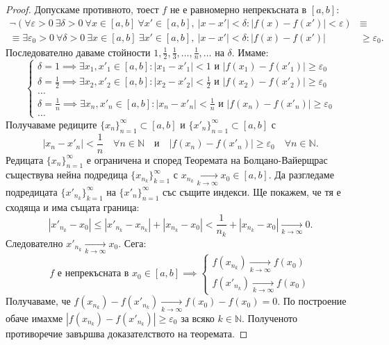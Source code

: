 \begin{proof}
Допускаме противното, тоест $f$ не е равномерно непрекъсната в $[a, b]$:
\begin{align*}
\neg (\forall \varepsilon > 0\ \exists \delta > 0\ \forall x \in [a, b]\ \forall x' \in [a, b],\ |x - x'| < \delta : |f(x) - f(x')| < \varepsilon) &\equiv \\
\equiv \exists \varepsilon_0 > 0\ \forall \delta > 0\ \exists x \in [a, b]\ \exists x' \in [a, b],\ |x - x'| < \delta : |f(x) - f(x')| &\ge \varepsilon_0.
\end{align*}
Последователно даваме стойности $1, \frac{1}{2}, \frac{1}{3}, \dots, \frac{1}{n}, \dots$ на $\delta$. Имаме:
\[
\begin{cases}
\delta = 1 \implies \exists x_1, x'_1 \in [a, b] : |x_1 - x'_1| < 1 \text{ и } |f(x_1) - f(x'_1)| \ge \varepsilon_0 \\
\delta = \frac{1}{2} \implies \exists x_2, x'_2 \in [a, b] : |x_2 - x'_2| < \frac{1}{2} \text{ и } |f(x_2) - f(x'_2)| \ge \varepsilon_0 \\
\dots \\
\delta = \frac{1}{n} \implies \exists x_n, x'_n \in [a, b] : |x_n - x'_n| < \frac{1}{n} \text{ и } |f(x_n) - f(x'_n)| \ge \varepsilon_0 \\
\dots
\end{cases}
\]
Получаваме редиците $\{x_n\}_{n=1}^\infty \subset [a, b]$ и $\{x'_n\}_{n=1}^\infty \subset [a, b]$ с
\[
|x_n - x'_n| < \frac{1}{n}\quad \forall n \in \mathbb{N} \quad \text{и} \quad |f(x_n) - f(x'_n)| \ge \varepsilon_0\quad \forall n \in \mathbb{N}.
\]
Редицата $\{x_n\}_{n=1}^\infty$ е ограничена и според Теоремата на Болцано-Вайерщрас съществува нейна подредица $\{x_{n_k}\}_{k=1}^\infty$ с $x_{n_k} \xrightarrow[k \to \infty]{} x_0 \in [a, b]$. Да разгледаме подредицата $\{x'_{n_k}\}_{k=1}^\infty$ на $\{x'_n\}_{n=1}^\infty$ със същите индекси. Ще покажем, че тя е сходяща и има същата граница:
\[
|x'_{n_k} - x_0| \le |x'_{n_k} - x_{n_k}| + |x_{n_k} - x_0| < \frac{1}{n_k} + |x_{n_k} - x_0| \xrightarrow[k \to \infty]{} 0.
\]
Следователно $x'_{n_k} \xrightarrow[k \to \infty]{} x_0$. Сега:
\[
f \text{ е непрекъсната в } x_0 \in [a, b] \implies
\begin{cases}
f(x_{n_k}) \xrightarrow[k \to \infty]{} f(x_0) \\
f(x'_{n_k}) \xrightarrow[k \to \infty]{} f(x_0)
\end{cases}
\]
Получаваме, че $f(x_{n_k}) - f(x'_{n_k}) \xrightarrow[k \to \infty]{} f(x_0) - f(x_0) = 0$. По построение обаче имахме $|f(x_{n_k}) - f(x'_{n_k})| \ge \varepsilon_0$ за всяко $k \in \mathbb{N}$. Полученото противоречие завършва доказателството на теоремата.
\end{proof}

